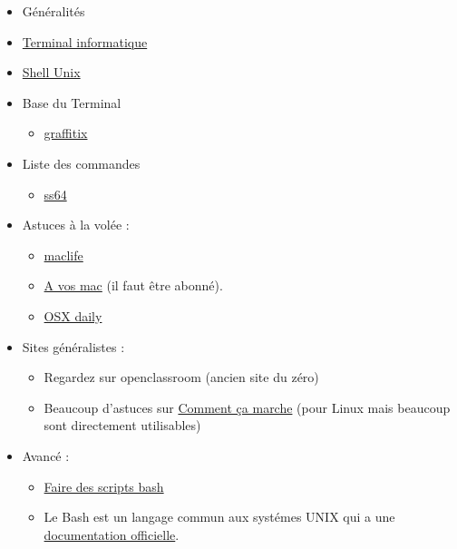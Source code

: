 \begin{itemize}
\item
  Généralités
\item
  \href{https://fr.wikipedia.org/wiki/Terminal_informatique}{Terminal
  informatique}
\item
  \href{https://fr.wikipedia.org/wiki/Shell_Unix}{Shell Unix}
\item
  Base du Terminal

  \begin{itemize}
  \tightlist
  \item
    \href{http://www.graffitix.fr/index.php?pg=MXTeBT1}{graffitix}
  \end{itemize}
\item
  Liste des commandes

  \begin{itemize}
  \tightlist
  \item
    \href{http://ss64.com/bash/}{ss64}
  \end{itemize}
\item
  Astuces à la volée :

  \begin{itemize}
  \tightlist
  \item
    \href{http://www.maclife.com/search/terminal\%20101}{maclife}
  \item
    \href{http://www.magazine-avosmac.com/avosmacV4/}{A vos mac} (il
    faut être abonné).
  \item
    \href{http://osxdaily.com/}{OSX daily}
  \end{itemize}
\item
  Sites généralistes :

  \begin{itemize}
  \tightlist
  \item
    Regardez sur openclassroom (ancien site du zéro)
  \item
    Beaucoup d'astuces sur
    \href{http://www.commentcamarche.net/faq/4801-guide-d-utilisation-du-shell-pour-debutant}{Comment
    ça marche} (pour Linux mais beaucoup sont directement utilisables)
  \end{itemize}
\item
  Avancé :

  \begin{itemize}
  \tightlist
  \item
    \href{http://abs.traduc.org/abs-fr/ch01.html}{Faire des scripts
    bash}
  \item
    Le Bash est un langage commun aux systémes UNIX qui a une
    \href{https://www.gnu.org/software/bash/manual/bashref.html}{documentation
    officielle}.
  \end{itemize}
\end{itemize}

